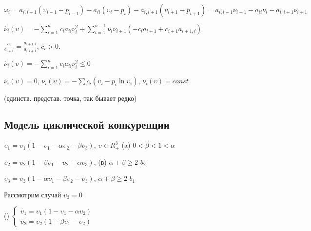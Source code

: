 \vspace{0.5cm}
\(\omega_i = a_{i,i-1}(\upsilon_{i-1}-p_{i-1}) - a_{ii}(\upsilon_i - p_i) - a_{i,i+1}(\upsilon_{i+1} - p_{i+1}) = a_{i,i-1}\nu_{i-1} - a_{ii}\nu_i - a_{i,i+1}\nu_{i+1}\)


\vspace{0.5cm}
\(\dot{\nu_i}(\upsilon) = -\sum_{i=1}^n c_ia_{ii}\nu_i^2 + \sum_{i=1}^{n-1} \nu_i\nu_{i+1}(-c_i a_{i+1} + c_{i+1}a_{i+1,i})\)

\vspace{0.5cm}
\(\frac{c_i}{c_{i+1}} = \frac{a_{i+1,i}}{a_{i,i+1}}\), \(c_i > 0\).

\vspace{0.5cm}
\(\dot{\nu_i}(\upsilon) = -\sum_{i=1}^n c_ia_{ii}\nu_i^2 \leq 0 \)

\vspace{0.5cm}
\(\dot{\nu_i}(\upsilon) = 0\), \hspace{10pt}\({\nu_i}(\upsilon) = -\sum c_i(\upsilon_i - p_i\ln \upsilon_i)\), \hspace{10pt} \({\nu_i}(\upsilon) = const\)

(единств. представ. точка, так бывает редко)

\vspace{0.5cm}

\subsection{Модель циклической конкуренции}

\vspace{0.5cm}
\(\dot{\upsilon_1} = \upsilon_1(1-\upsilon_1 - \alpha\upsilon_2 - \beta\upsilon_3) \), \hspace{3cm}\( \upsilon \in R_+^3\) \hspace{2cm} (a) \(0 < \beta < 1 < \alpha\)

\(\dot{\upsilon_2} = \upsilon_2(1-\beta\upsilon_1 - \upsilon_2 - \alpha\upsilon_3) \), \hspace{6.3cm} (в) \(\alpha+\beta\geq 2\) \(b_2\)

\(\dot{\upsilon_3} = \upsilon_3(1-\alpha\upsilon_1 - \beta\upsilon_2 - \upsilon_3) \),
\hspace{6.6cm} \(\alpha+\beta\geq 2\) \(b_1\)


\vspace{0.5cm}
Рассмотрим случай { \underline{\(\upsilon_3 = 0\)}}

\vspace{0.5cm}
({})
\(
 \begin{cases}
    \dot{\upsilon_1} = \upsilon_1(1-\upsilon_1 - \alpha\upsilon_2 ) 
    \\
    \dot{\upsilon_2} = \upsilon_2(1-\beta\upsilon_1 - \upsilon_2 ) 
 \end{cases}
\)

